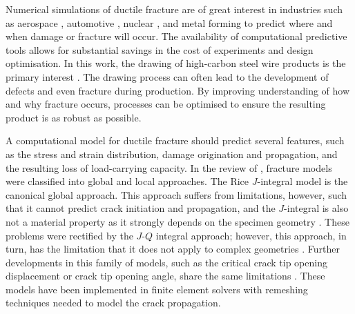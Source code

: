 \documentclass[sn-mathphys,Numbered]{sn-jnl}%
\begin{document}
Numerical simulations of ductile fracture are of great interest in industries such as aerospace \cite{riccio_damage_2015, johnson_numerical_2015}, automotive \cite{alharbi_damage_2015, sirinakorn_microstructure_2014, sarraf_mesoscale_2017, uthaisangsuk_characterisation_2009}, nuclear \cite{chen_modeling_2020}, and metal forming \cite{masse_study_2010, cao_models_2017, tekkaya_damage_2020, clancy_improving_2019, borchers_cold-drawn_2016, cardiff_lagrangian_2017} to predict where and when damage or fracture will occur.
The availability of computational predictive tools allows for substantial savings in the cost of experiments and design optimisation.
In this work, the drawing of high-carbon steel wire products is the primary interest \cite{clancy_improving_2019, borchers_cold-drawn_2016}.
The drawing process can often lead to the development of defects and even fracture during production.
By improving understanding of how and why fracture occurs, processes can be optimised to ensure the resulting product is as robust as possible.

A computational model for ductile fracture should predict several features, such as the stress and strain distribution, damage origination and propagation, and the resulting loss of load-carrying capacity. %
In the review of \citet{besson_continuum_2010}, fracture models were classified into global and local approaches.
The Rice $J$-integral model is the canonical global approach. This approach suffers from limitations, however, such that it cannot predict crack initiation and propagation, and the $J$-integral is also not a material property as it strongly depends on the specimen geometry \cite{hackett_experimental_1993}. These problems were rectified by the $J$-$Q$ integral approach; however, this approach, in turn, has the limitation that it does not apply to complex geometries \cite{odowd_family_1991}. Further developments in this family of models, such as the critical crack tip opening displacement or crack tip opening angle, share the same limitations \cite{james_effect_2003,mahmoud_effect_2003}. These models have been implemented in finite element solvers with remeshing techniques needed to model the crack propagation.
\end{document}
